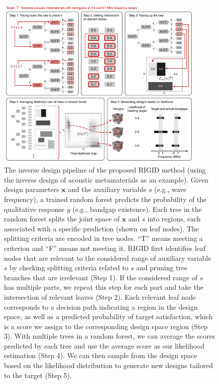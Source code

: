 \documentclass{article}
\begin{document}
\begin{figure}[h]
\centering
\includegraphics[width=0.9\textwidth]{fig/rigid.pdf}
\caption{The inverse design pipeline of the proposed RIGID method (using the inverse design of acoustic metamaterials as an example). Given design parameters $\mathbf{x}$ and the auxiliary variable $s$ (e.g., wave frequency), a trained random forest predicts the probability of the qualitative response $y$ (e.g., bandgap existence). Each tree in the random forest splits the joint space of $\mathbf{x}$ and $s$ into regions, each associated with a specific prediction (shown on leaf nodes). The splitting criteria are encoded in tree nodes. ``T'' means meeting a criterion and ``F'' means not meeting it. RIGID first identifies leaf nodes that are relevant to the considered range of auxiliary variable $s$ by checking splitting criteria related to $s$ and pruning tree branches that are irrelevant (Step 1). If the considered range of $s$ has multiple parts, we repeat this step for each part and take the intersection of relevant leaves (Step 2). Each relevant leaf node corresponds to a decision path indicating a region in the design space, as well as a predicted probability of target satisfaction, which is a score we assign to the corresponding design space region (Step 3). With multiple trees in a random forest, we can average the scores predicted by each tree and use the average score as our likelihood estimation (Step 4). We can then sample from the design space based on the likelihood distribution to generate new designs tailored to the target (Step 5).}
\label{fig:rigid}
\end{figure}
\end{document}
